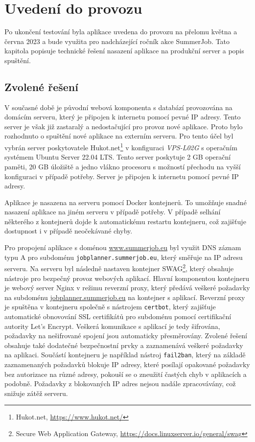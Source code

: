 \chapter{Uvedení do provozu}

Po ukončení testování byla aplikace uvedena do provozu na přelomu května a června 2023 a bude využita
pro nadcházející ročník akce SummerJob. Tato kapitola popisuje
technické řešení nasazení aplikace na produkční server a popis spuštění.

\section{Zvolené řešení}

V současné době je původní webová komponenta s databází provozována na domácím serveru,
který je připojen k internetu pomocí pevné IP adresy. Tento server je však již zastaralý a
nedostačující pro provoz nové aplikace. Proto bylo rozhodnuto o spuštění nové aplikace na
externím serveru. Pro tento účel byl vybrán server poskytovatele Hukot.net\footnote{Hukot.net, \url{https://www.hukot.net/}}
v konfiguraci \textit{VPS-L02G} s operačním systémem Ubuntu Server 22.04 LTS. Tento server
poskytuje 2 GB operační paměti, 20 GB úložiště a jedno vlákno procesoru s možností přechodu
na vyšší konfiguraci v případě potřeby. Server je připojen k internetu pomocí pevné IP adresy.

Aplikace je nasazena na serveru pomocí Docker kontejnerů. To umožňuje snadné nasazení aplikace
na jiném serveru v případě potřeby. V případě selhání některého z kontejnerů dojde k automatickému
restartu kontejneru, což zajišťuje dostupnost i v případě neočekávané chyby.

Pro propojení aplikace s doménou \url{www.summerjob.eu} byl využit DNS záznam typu A pro subdoménu
\texttt{jobplanner.summerjob.eu}, který směřuje na IP adresu serveru. Na serveru byl následně
nastaven kontejner SWAG\footnote{Secure Web Application Gateway, \url{https://docs.linuxserver.io/general/swag}}, který obsahuje nástroje pro bezpečný provoz webových aplikací.
Hlavní komponentou kontejneru je webový server Nginx v režimu reverzní proxy, který předává veškeré požadavky na subdoménu
\href{https://jobplanner.summerjob.eu}{jobplanner.summerjob.eu} na kontejner s aplikací. Reverzní proxy je spuštěna v kontejneru
společně s nástrojem \texttt{certbot}, který zajišťuje automatické obnovování SSL certifikátů pro subdoménu
pomocí certifikační autority Let's Encrypt. Veškerá komunikace s aplikací je tedy šifrována, požadavky na
nešifrované spojení jsou automaticky přesměrovány. 
Zvolené řešení obsahuje také dodatečné bezpečnostní prvky a zaznamenává veškeré požadavky na aplikaci.
Součástí kontejneru je například nástroj \texttt{fail2ban}, který na základě zaznamenaných požadavků
blokuje IP adresy, které posílají opakované požadavky bez autorizace na různé adresy, pokouší se o
zneužití častých chyb v aplikacích a podobně. Požadavky z blokovaných IP adres nejsou nadále zpracovávány, 
což snižuje zátěž serveru.


